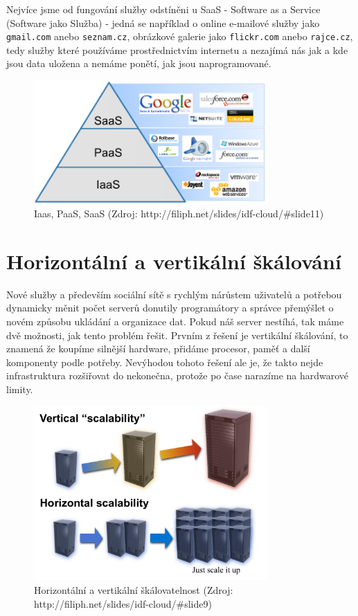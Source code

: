 Nejvíce jsme od fungování služby odstíněni u SaaS - Software as a Service (Software jako Služba) - jedná se například o online e-mailové služby jako \verb|gmail.com| anebo \verb|seznam.cz|, obrázkové galerie jako \verb|flickr.com| anebo \verb|rajce.cz|, tedy služby které používáme prostřednictvím internetu a nezajímá nás jak a kde jsou data uložena a nemáme ponětí, jak jsou naprogramované.

\begin{figure}[h]
\begin{center}
\includegraphics[width=3.5in]{figures/iaas-paas-saas.png}
\caption[Iaas, PaaS, SaaS]{Iaas, PaaS, SaaS (Zdroj: http://filiph.net/slides/idf-cloud/\#slide11)}
\label{fig:iaas-paas-saas}
\end{center}
\end{figure}

\section{Horizontální a vertikální škálování}
Nové služby a především sociální sítě s rychlým nárůstem uživatelů a potřebou dynamicky měnit počet serverů donutily programátory a správce přemýšlet o novém způsobu ukládání a organizace dat. Pokud náš server nestíhá, tak máme dvě možnosti, jak tento problém řešit. Prvním z řešení je vertikální škálování, to znamená že koupíme silnější hardware, přidáme procesor, paměť a další komponenty podle potřeby. Nevýhodou tohoto řešení ale je, že takto nejde infrastruktura rozšiřovat do nekonečna, protože po čase narazíme na hardwarové limity. 

\begin{figure}[h]
\begin{center}
\includegraphics[width=3.5in]{figures/horizontal-vertical-scalability.jpeg}
\caption[Horizontální a vertikální škálovatelnost]{Horizontální a vertikální škálovatelnost 
(Zdroj: http://filiph.net/slides/idf-cloud/\#slide9)}
\label{fig:horizontal-vertical-scalability}
\end{center}
\end{figure}

